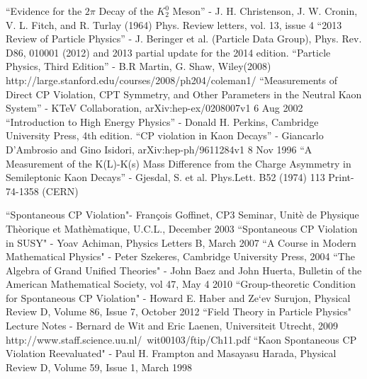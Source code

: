 \documentclass[floatfix,aps,prd,amsmath,amssymb]{revtex4}
\begin{document}
\begin{thebibliography}{10}
``Evidence for the $2 \pi$ Decay of the $K^0_2$ Meson'' - J. H. Christenson, J. W. Cronin, V. L. Fitch, and R. Turlay (1964) Phys. Review letters, vol. 13, issue 4
``2013 Review of Particle Physics'' - J. Beringer et al. (Particle Data Group), Phys. Rev. D86, 010001 (2012) and 2013 partial update for the 2014 edition.
``Particle Physics, Third Edition'' - B.R Martin, G. Shaw, Wiley(2008)  
http://large.stanford.edu/courses/2008/ph204/coleman1/  
``Measurements of Direct CP Violation, CPT Symmetry, and Other Parameters in the Neutral Kaon System'' - KTeV Collaboration, arXiv:hep-ex/0208007v1 6 Aug 2002
``Introduction to High Energy Physics'' - Donald H. Perkins, Cambridge University Press, 4th edition.
``CP violation in Kaon Decays'' - Giancarlo D’Ambrosio and Gino Isidori, arXiv:hep-ph/9611284v1 8 Nov 1996
``A Measurement of the K(L)-K(s) Mass Difference from the Charge Asymmetry in Semileptonic Kaon Decays'' - Gjesdal, S. et al. Phys.Lett. B52 (1974) 113 Print-74-1358 (CERN)

``Spontaneous CP Violation"- Fran\c{c}ois Goffinet, CP3 Seminar, Unit\`{e} de Physique Th\`{e}orique et Math\`{e}matique, U.C.L., December 2003
``Spontaneous CP Violation in SUSY" - Yoav Achiman, Physics Letters B, March 2007
``A Course in Modern Mathematical Physics" - Peter Szekeres, Cambridge University Press, 2004
``The Algebra of Grand Unified Theories" - John Baez and John Huerta, Bulletin of the American Mathematical Society, vol 47, May 4 2010
 ``Group-theoretic Condition for Spontaneous CP Violation" - Howard E. Haber and Ze`ev Surujon, Physical Review D, Volume 86, Issue 7, October 2012
 ``Field Theory in Particle Physics" Lecture Notes -  Bernard de Wit and Eric Laenen, Universiteit Utrecht, 2009 http://www.staff.science.uu.nl/~wit00103/ftip/Ch11.pdf
``Kaon Spontaneous CP Violation Reevaluated" - Paul H. Frampton and Masayasu Harada, Physical Review D, Volume 59, Issue 1, March 1998


\end{thebibliography}
\end{document}
